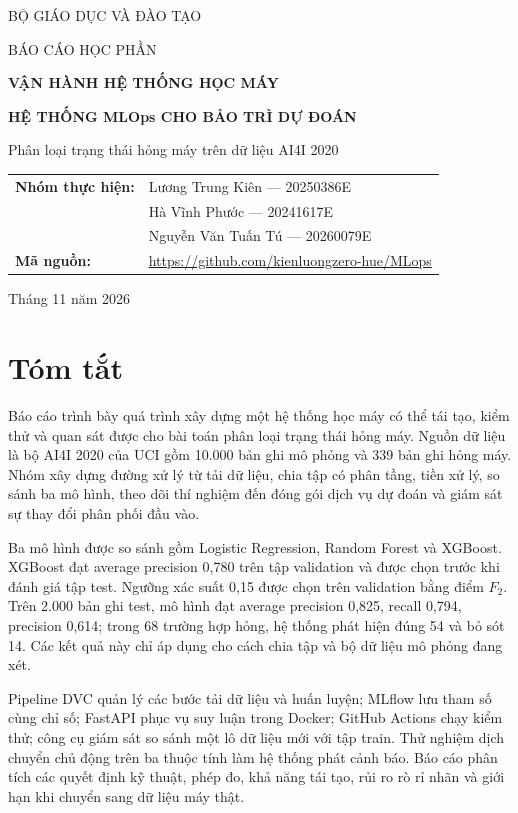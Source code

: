 \documentclass[12pt,a4paper,oneside]{report}
\newcommand{\dataset}{AI4I 2020}
\begin{document}
\begin{titlepage}
\centering
{\large BỘ GIÁO DỤC VÀ ĐÀO TẠO\par}
\vspace{0.4cm}
{\large BÁO CÁO HỌC PHẦN\par}
\vspace{2.8cm}
{\Large\bfseries VẬN HÀNH HỆ THỐNG HỌC MÁY\par}
\vspace{1.0cm}
{\Huge\bfseries HỆ THỐNG MLOps CHO BẢO TRÌ DỰ ĐOÁN\par}
\vspace{0.4cm}
{\Large Phân loại trạng thái hỏng máy trên dữ liệu AI4I 2020\par}
\vspace{2cm}
\begin{tabular}{ll}
\textbf{Nhóm thực hiện:} & Lương Trung Kiên --- 20250386E\\
& Hà Vĩnh Phước --- 20241617E\\
& Nguyễn Văn Tuấn Tú --- 20260079E\\
\textbf{Mã nguồn:} & \url{https://github.com/kienluongzero-hue/MLops}
\end{tabular}
\vfill
{\large Tháng 11 năm 2026\par}
\end{titlepage}
\clearpage
\chapter*{Tóm tắt}
Báo cáo trình bày quá trình xây dựng một hệ thống học máy có thể tái tạo, kiểm thử và quan sát được cho bài toán phân loại trạng thái hỏng máy. Nguồn dữ liệu là bộ \dataset{} của UCI gồm 10.000 bản ghi mô phỏng và 339 bản ghi hỏng máy. Nhóm xây dựng đường xử lý từ tải dữ liệu, chia tập có phân tầng, tiền xử lý, so sánh ba mô hình, theo dõi thí nghiệm đến đóng gói dịch vụ dự đoán và giám sát sự thay đổi phân phối đầu vào.

Ba mô hình được so sánh gồm Logistic Regression, Random Forest và XGBoost. XGBoost đạt average precision 0,780 trên tập validation và được chọn trước khi đánh giá tập test. Ngưỡng xác suất 0,15 được chọn trên validation bằng điểm $F_2$. Trên 2.000 bản ghi test, mô hình đạt average precision 0,825, recall 0,794, precision 0,614; trong 68 trường hợp hỏng, hệ thống phát hiện đúng 54 và bỏ sót 14. Các kết quả này chỉ áp dụng cho cách chia tập và bộ dữ liệu mô phỏng đang xét.

Pipeline DVC quản lý các bước tải dữ liệu và huấn luyện; MLflow lưu tham số cùng chỉ số; FastAPI phục vụ suy luận trong Docker; GitHub Actions chạy kiểm thử; công cụ giám sát so sánh một lô dữ liệu mới với tập train. Thử nghiệm dịch chuyển chủ động trên ba thuộc tính làm hệ thống phát cảnh báo. Báo cáo phân tích các quyết định kỹ thuật, phép đo, khả năng tái tạo, rủi ro rò rỉ nhãn và giới hạn khi chuyển sang dữ liệu máy thật.
\end{document}
